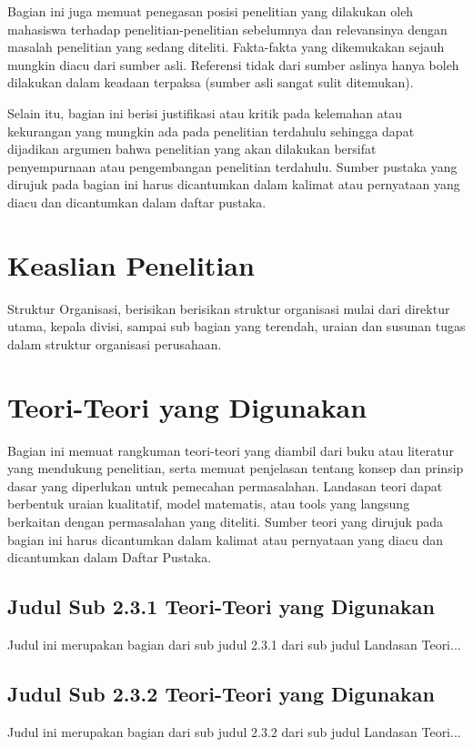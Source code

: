 \documentclass[oneside,listof=totoc]{scrbook}
\begin{document}
Bagian ini juga memuat penegasan posisi penelitian yang dilakukan oleh mahasiswa terhadap penelitian-penelitian sebelumnya dan relevansinya dengan masalah penelitian yang sedang diteliti. Fakta-fakta yang dikemukakan sejauh mungkin diacu dari sumber asli. Referensi tidak dari sumber aslinya hanya boleh dilakukan dalam keadaan terpaksa (sumber asli sangat sulit ditemukan).

Selain itu, bagian ini berisi justifikasi atau kritik pada kelemahan atau kekurangan yang mungkin ada pada penelitian terdahulu sehingga dapat dijadikan argumen bahwa penelitian yang akan dilakukan bersifat penyempurnaan atau pengembangan penelitian terdahulu. Sumber pustaka yang dirujuk pada bagian ini harus dicantumkan dalam kalimat atau pernyataan yang diacu dan dicantumkan dalam daftar pustaka.

\section{Keaslian Penelitian}
Struktur Organisasi, berisikan berisikan struktur organisasi mulai dari direktur utama, kepala divisi, sampai sub bagian yang terendah, uraian dan susunan tugas dalam struktur organisasi perusahaan.

\section{Teori-Teori yang Digunakan}
Bagian ini memuat rangkuman teori-teori yang diambil dari buku atau literatur yang mendukung penelitian, serta memuat penjelasan tentang konsep dan prinsip dasar yang diperlukan untuk pemecahan permasalahan. Landasan teori dapat berbentuk uraian kualitatif, model matematis, atau tools yang langsung berkaitan dengan permasalahan yang diteliti. Sumber teori yang dirujuk pada bagian ini harus dicantumkan dalam kalimat atau pernyataan yang diacu dan dicantumkan dalam Daftar Pustaka.

\subsection{Judul Sub 2.3.1 Teori-Teori yang Digunakan}
Judul ini merupakan bagian dari sub judul 2.3.1 dari sub judul Landasan Teori...

\subsection{Judul Sub 2.3.2 Teori-Teori yang Digunakan}
Judul ini merupakan bagian dari sub judul 2.3.2 dari sub judul Landasan Teori...
\end{document}
